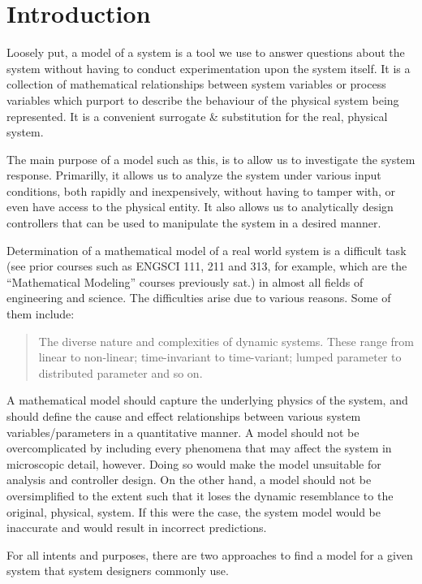 \documentclass[
  14pt,
  a4paper,
  oneside,
  open=any,
  a4paper,
  14pt]{report}
\begin{document}
\section{Introduction}\label{introduction-4}

Loosely put, a model of a system is a tool we use to answer questions
about the system without having to conduct experimentation upon the
system itself. It is a collection of mathematical relationships between
system variables or process variables which purport to describe the
behaviour of the physical system being represented. It is a convenient
surrogate \& substitution for the real, physical system.

The main purpose of a model such as this, is to allow us to investigate
the system response. Primarilly, it allows us to analyze the system
under various input conditions, both rapidly and inexpensively, without
having to tamper with, or even have access to the physical entity. It
also allows us to analytically design controllers that can be used to
manipulate the system in a desired manner.

Determination of a mathematical model of a real world system is a
difficult task (see prior courses such as ENGSCI 111, 211 and 313, for
example, which are the ``Mathematical Modeling'' courses previously
sat.) in almost all fields of engineering and science. The difficulties
arise due to various reasons. Some of them include:

\begin{quote}
The diverse nature and complexities of dynamic systems. These range from
linear to non-linear; time-invariant to time-variant; lumped parameter
to distributed parameter and so on.
\end{quote}

A mathematical model should capture the underlying physics of the
system, and should define the cause and effect relationships between
various system variables/parameters in a quantitative manner. A model
should not be overcomplicated by including every phenomena that may
affect the system in microscopic detail, however. Doing so would make
the model unsuitable for analysis and controller design. On the other
hand, a model should not be oversimplified to the extent such that it
loses the dynamic resemblance to the original, physical, system. If this
were the case, the system model would be inaccurate and would result in
incorrect predictions.

For all intents and purposes, there are two approaches to find a model
for a given system that system designers commonly use.
\end{document}
